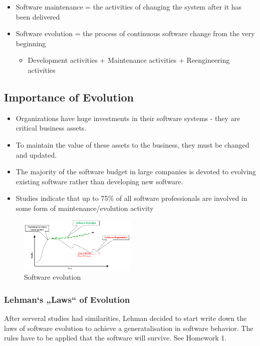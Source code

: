 \begin{itemize}
\tightlist
\item
  Software maintenance = the activities of changing the system after it
  has been delivered
\item
  Software evolution = the process of continuous software change from
  the very beginning

  \begin{itemize}
  \tightlist
  \item
    Development activities + Maintenance activities + Reengineering
    activities
  \end{itemize}
\end{itemize}

\hypertarget{importance-of-evolution}{%
\subsection{Importance of Evolution}\label{importance-of-evolution}}

\begin{itemize}
\tightlist
\item
  Organizations have huge investments in their software systems - they
  are critical business assets.
\item
  To maintain the value of these assets to the business, they must be
  changed and updated.
\item
  The majority of the software budget in large companies is devoted to
  evolving existing software rather than developing new software.
\item
  Studies indicate that up to 75\% of all software professionals are
  involved in some form of maintenance/evolution activity
\end{itemize}

\begin{figure}[H]
\centering
\includegraphics[width=0.5\textwidth]{figures/softwareEvolution.png}
\caption{Software evolution}
\end{figure}


\hypertarget{lehmans-laws-of-evolution}{%
\subsubsection{Lehman`s „Laws`` of
Evolution}\label{lehmans-laws-of-evolution}}
After serveral studies had similarities, Lehman decided to start write down the laws of software evolution to achieve a generatalisation in software behavior. The rules have to be applied that the software will survive. See Homework 1.

